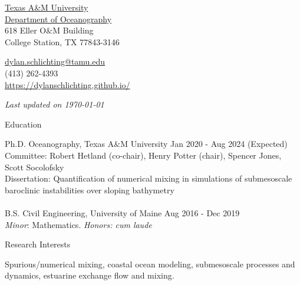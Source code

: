 \documentclass{resume} %
\newcommand{\updateinfo}[1][\today]{\par\vfill{\textit{Last updated on #1}}}
\begin{document}
\begin{minipage}[ht]{0.35\textwidth}
  \href{http://www.tamu.edu/}{Texas A\&M University} \\
  \href{http://ocean.tamu.edu/}{Department of Oceanography} \\
  618 Eller O$\&$M Building  \\
  College Station, TX 77843-3146
\end{minipage}
\begin{minipage}[ht]{0.6\textwidth}
  \href{mailto:dylan.schlichting@tamu.edu}{dylan.schlichting@tamu.edu} \\
  (413) 262-4393\\
  \url{https://dylanschlichting.github.io/}
  \updateinfo
\end{minipage}
\vspace{-65 pt}

\vspace{60pt}
\begin{rSection}{Education}

Ph.D. Oceanography, Texas A$\&$M 
University \hfill {Jan 2020 - Aug 2024 (Expected)
}
\\
Committee: Robert Hetland (co-chair), Henry Potter (chair), Spencer Jones, Scott Socolofsky
\\
Dissertation: Quantification of numerical mixing in simulations of submesoscale baroclinic instabilities over sloping bathymetry
\\
\\
B.S. Civil Engineering, University of Maine \hfill {Aug 2016 - Dec 2019}
\\ 
{\textit{Minor}:} Mathematics. \textit{Honors: cum laude}
\end{rSection}

\begin{rSection}{Research Interests}
\vspace{-10pt}
\item Spurious/numerical mixing, coastal ocean modeling, submesoscale processes and dynamics, estuarine exchange flow and mixing.

\end{rSection}
\end{document}
